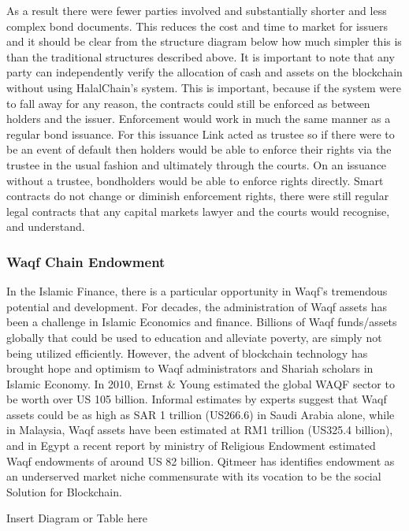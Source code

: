 \documentclass[a4paper,11pt]{article}
\begin{document}
As a result there were fewer parties involved and substantially shorter and less complex bond documents. This reduces the cost and time to market for issuers and it should be clear from the structure diagram below how much simpler this is than the traditional structures described above.
It is important to note that any party can independently verify the allocation of cash and assets on the blockchain without using HalalChain’s system. This is important, because if the system were to fall away for any reason, the contracts could still be enforced as between holders and the issuer. Enforcement would work in much the same manner as a regular bond issuance. For this issuance Link acted as trustee so if there were to be an event of default then holders would be able to enforce their rights via the trustee in the usual fashion and ultimately through the courts. On an issuance without a trustee, bondholders would be able to enforce rights directly. Smart contracts do not change or diminish enforcement rights, there were still regular legal contracts that any capital markets lawyer and the courts would recognise, and understand.

\subsubsection{Waqf Chain Endowment}

In the Islamic Finance, there is a particular opportunity in Waqf’s tremendous potential and development. For decades, the administration of Waqf assets has been a challenge in Islamic Economics and finance. Billions of Waqf funds/assets globally that could be used to education and alleviate poverty, are simply not being utilized efficiently. However, the advent of blockchain technology has brought hope and optimism to Waqf administrators and Shariah scholars in Islamic Economy. 
In 2010, Ernst \& Young estimated the global WAQF sector to be worth over US 105 billion. Informal estimates by experts suggest that Waqf assets could be as high as SAR 1 trillion (US266.6) in Saudi Arabia alone, while in Malaysia, Waqf assets have been estimated at RM1 trillion (US325.4 billion), and in Egypt a recent report by ministry of Religious Endowment estimated Waqf endowments of around US 82 billion. Qitmeer has identifies endowment as an underserved market niche commensurate with its vocation to be the social Solution for Blockchain.

                                           Insert Diagram or Table here
\end{document}
